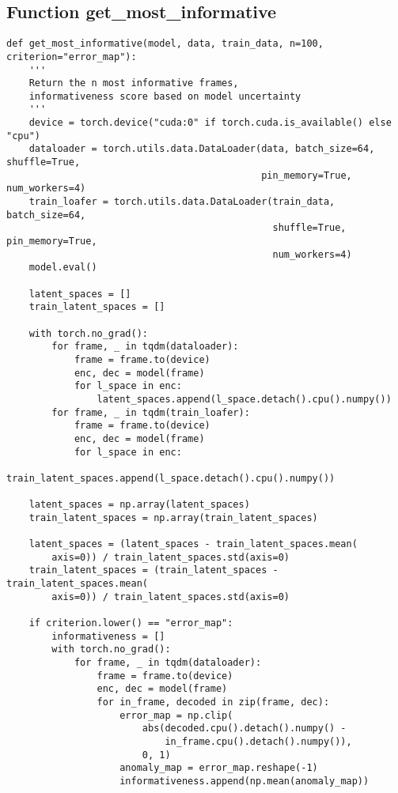 \subsection{Function get_most_informative}
\lstset{language=python}
\begin{lstlisting}
def get_most_informative(model, data, train_data, n=100, criterion="error_map"):
    '''
    Return the n most informative frames,
    informativeness score based on model uncertainty
    '''
    device = torch.device("cuda:0" if torch.cuda.is_available() else "cpu")
    dataloader = torch.utils.data.DataLoader(data, batch_size=64, shuffle=True,
                                             pin_memory=True, num_workers=4)
    train_loafer = torch.utils.data.DataLoader(train_data, batch_size=64,
                                               shuffle=True, pin_memory=True,
                                               num_workers=4)
    model.eval()

    latent_spaces = []
    train_latent_spaces = []

    with torch.no_grad():
        for frame, _ in tqdm(dataloader):
            frame = frame.to(device)
            enc, dec = model(frame)
            for l_space in enc:
                latent_spaces.append(l_space.detach().cpu().numpy())
        for frame, _ in tqdm(train_loafer):
            frame = frame.to(device)
            enc, dec = model(frame)
            for l_space in enc:
                train_latent_spaces.append(l_space.detach().cpu().numpy())

    latent_spaces = np.array(latent_spaces)
    train_latent_spaces = np.array(train_latent_spaces)

    latent_spaces = (latent_spaces - train_latent_spaces.mean(
        axis=0)) / train_latent_spaces.std(axis=0)
    train_latent_spaces = (train_latent_spaces - train_latent_spaces.mean(
        axis=0)) / train_latent_spaces.std(axis=0)

    if criterion.lower() == "error_map":
        informativeness = []
        with torch.no_grad():
            for frame, _ in tqdm(dataloader):
                frame = frame.to(device)
                enc, dec = model(frame)
                for in_frame, decoded in zip(frame, dec):
                    error_map = np.clip(
                        abs(decoded.cpu().detach().numpy() -
                            in_frame.cpu().detach().numpy()),
                        0, 1)
                    anomaly_map = error_map.reshape(-1)
                    informativeness.append(np.mean(anomaly_map))


\end{lstlisting}
